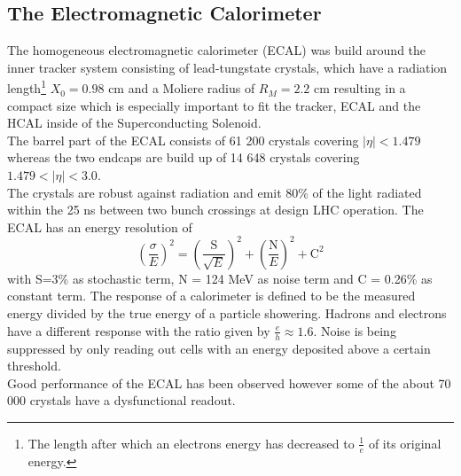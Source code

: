 \subsection{The Electromagnetic Calorimeter}
\label{sec:ecal}
The homogeneous electromagnetic calorimeter (ECAL)\cite{Chatrchyan:2008zzk}\cite{bib:cmsptdr1}\cite{bib:cmstdr:ecal} was build around the inner tracker system consisting of lead-tungstate crystals, which have a radiation length\footnote{The length after which an electrons energy has decreased to $\frac{1}{e}$ of its original energy.} $X_0 = 0.98$ cm and a Moliere radius of $R_M = 2.2$ cm resulting in a compact size which is especially important to fit the tracker, ECAL and the HCAL inside of the Superconducting Solenoid.\\
The barrel part of the ECAL consists of 61 200 crystals covering $|\eta| < 1.479$ whereas the two endcaps are build up of 14 648 crystals covering $ 1.479< |\eta| <3.0$.\\
The crystals are robust against radiation and emit 80\% of the light radiated within the 25 ns between two bunch crossings at design LHC operation. The ECAL has an energy resolution of 
$$ \left(\frac{\sigma}{E} \right)^2= \left(\frac{\text{S}}{\sqrt{E}} \right)^2 +\left(\frac{\text{N}}{E}\right)^2+ \text{C}^2 $$
with S=3\% as stochastic term, N = 124 MeV as noise term and C = 0.26\% as constant term.	
The response of a calorimeter is defined to be the measured energy divided by the true energy of a particle showering. Hadrons and electrons have a different response with the ratio given by $\frac{e}{h}\approx 1.6$. Noise is being suppressed by only reading out cells with an energy deposited above a certain threshold.\\
Good performance of the ECAL has been observed however some of the about 70 000 crystals have a dysfunctional readout.


